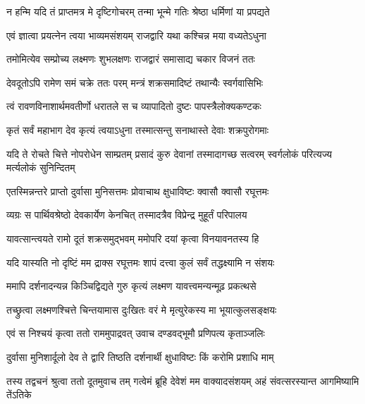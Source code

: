 \twolineshloka
{न हन्मि यदि तं प्राप्तमत्र मे दृष्टिगोचरम्}
{तन्मा भून्मे गतिः श्रेष्ठा धर्मिणां या प्रपद्यते}%

\twolineshloka
{एवं ज्ञात्वा प्रयत्नेन त्वया भाव्यमसंशयम्}
{राजद्वारि यथा कश्चिन्न मया वध्यतेऽधुना}%

\twolineshloka
{तमोमित्येव सम्प्रोच्य लक्ष्मणः शुभलक्षणः}
{राजद्वारं समासाद्य चकार विजनं ततः}%

\twolineshloka
{देवदूतोऽपि रामेण समं चक्रे ततः परम्}
{मन्त्रं शक्रसमादिष्टं तथान्यैः स्वर्गवासिभिः}%


\twolineshloka
{त्वं रावणविनाशार्थमवतीर्णो धरातले}
{स च व्यापादितो दुष्टः पापस्त्रैलोक्यकण्टकः}%

\twolineshloka
{कृतं सर्वं महाभाग देव कृत्यं त्वयाऽधुना}
{तस्मात्सन्तु सनाथास्ते देवाः शक्रपुरोगमाः}%

\threelineshloka
{यदि ते रोचते चित्ते नोपरोधेन साम्प्रतम्}
{प्रसादं कुरु देवानां तस्मादागच्छ सत्वरम्}
{स्वर्गलोकं परित्यज्य मर्त्यलोकं सुनिन्दितम्}%


\twolineshloka
{एतस्मिन्नन्तरे प्राप्तो दुर्वासा मुनिसत्तमः}
{प्रोवाचाथ क्षुधाविष्टः क्वासौ क्वासौ रघूत्तमः}%


\twolineshloka
{व्यग्रः स पार्थिवश्रेष्ठो देवकार्येण केनचित्}
{तस्मादत्रैव विप्रेन्द्र मुहूर्तं परिपालय}%

\twolineshloka
{यावत्सान्त्वयते रामो दूतं शक्रसमुद्भवम्}
{ममोपरि दयां कृत्वा विनयावनतस्य हि}%


\twolineshloka
{यदि यास्यति नो दृष्टिं मम द्राक्स रघूत्तमः}
{शापं दत्त्वा कुलं सर्वं तद्धक्ष्यामि न संशयः}%

\twolineshloka
{ममापि दर्शनादन्यन्न किञ्चिद्विद्यते गुरु}
{कृत्यं लक्ष्मण यावत्त्वमन्यन्मूढ़ प्रकत्थसे}%

\twolineshloka
{तच्छ्रुत्वा लक्ष्मणश्चित्ते चिन्तयामास दुःखितः}
{वरं मे मृत्युरेकस्य मा भूयात्कुलसङ्क्षयः}%

\twolineshloka
{एवं स निश्चयं कृत्वा ततो राममुपाद्रवत्}
{उवाच दण्डवद्भूमौ प्रणिपत्य कृताञ्जलिः}%

\twolineshloka
{दुर्वासा मुनिशार्दूलो देव ते द्वारि तिष्ठति}
{दर्शनार्थी क्षुधाविष्टः किं करोमि प्रशाधि माम्}%

\threelineshloka
{तस्य तद्वचनं श्रुत्वा ततो दूतमुवाच तम्}
{गत्वेमं ब्रूहि देवेशं मम वाक्यादसंशयम्}
{अहं संवत्सरस्यान्त आगमिष्यामि तेंऽतिके}%

